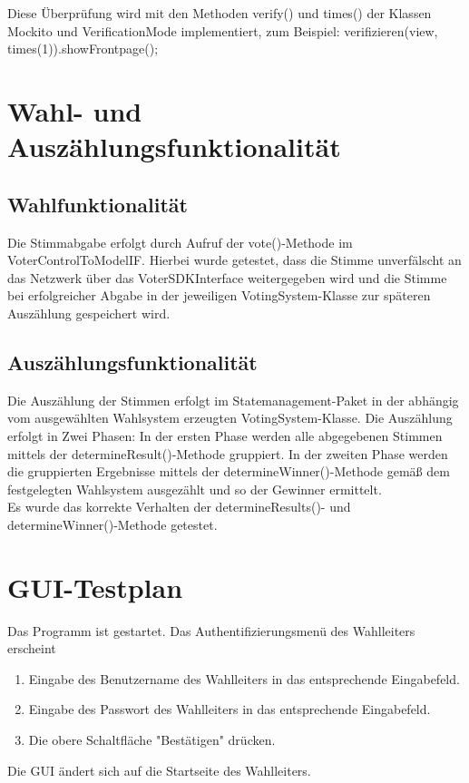 \documentclass[parskip=full]{scrartcl}
\begin{document}
Diese Überprüfung wird mit den Methoden verify() und times() der Klassen Mockito und VerificationMode implementiert, zum Beispiel: 
verifizieren(view, times(1)).showFrontpage();

\section{Wahl- und Auszählungsfunktionalität}
\subsection{Wahlfunktionalität}
Die Stimmabgabe erfolgt durch Aufruf der vote()-Methode im VoterControlToModelIF.
Hierbei wurde getestet, dass die Stimme unverfälscht an das Netzwerk über das VoterSDKInterface weitergegeben wird und die Stimme bei erfolgreicher Abgabe in der jeweiligen VotingSystem-Klasse zur späteren Auszählung gespeichert wird.


\subsection{Auszählungsfunktionalität}
Die Auszählung der Stimmen erfolgt im Statemanagement-Paket in der abhängig vom ausgewählten Wahlsystem erzeugten VotingSystem-Klasse.
Die Auszählung erfolgt in Zwei Phasen: In der ersten Phase werden alle abgegebenen Stimmen mittels der determineResult()-Methode gruppiert.
In der zweiten Phase werden die gruppierten Ergebnisse mittels der determineWinner()-Methode gemäß dem festgelegten Wahlsystem ausgezählt und so der Gewinner ermittelt.\\
Es wurde das korrekte Verhalten der determineResults()- und determineWinner()-Methode getestet.

\section{GUI-Testplan}
		{Das Programm ist gestartet.}
		{Das Authentifizierungsmenü des Wahlleiters erscheint}

\teststep{}
		{\begin{enumerate}
				\item Eingabe des Benutzername des Wahlleiters in das entsprechende Eingabefeld.
				\item Eingabe des Passwort des Wahlleiters in das entsprechende Eingabefeld.
				\item Die obere Schaltfläche "Bestätigen" drücken.
		\end{enumerate}}
		{Die GUI ändert sich auf die Startseite des Wahlleiters.}
		
\end{document}
